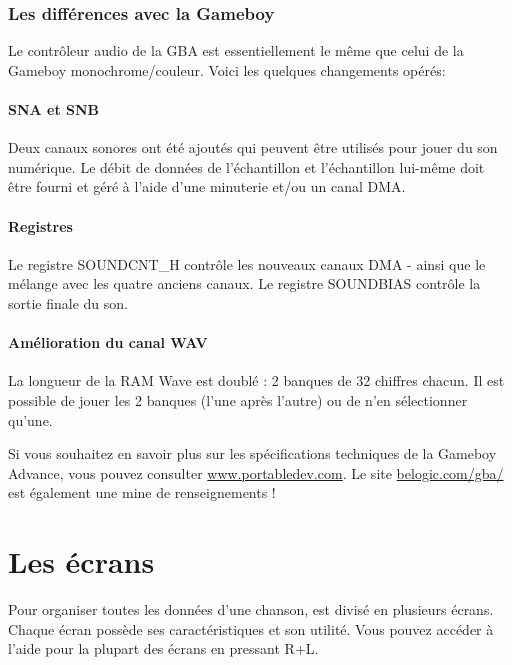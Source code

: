 \documentclass[12pt,a4paper]{article}
\begin{document}
        \subsubsection{Les différences avec la Gameboy}
        
        Le contrôleur audio de la GBA est essentiellement le même que celui de la Gameboy monochrome/couleur. Voici les quelques changements opérés:
        
            \paragraph{SNA et SNB} Deux canaux sonores ont été ajoutés qui peuvent être utilisés pour jouer du son numérique. Le débit de données de l'échantillon et l'échantillon lui-même doit être fourni et géré à l'aide d'une minuterie et/ou un canal DMA.
            
            \paragraph{Registres} Le registre SOUNDCNT\_H contrôle les nouveaux canaux DMA - ainsi que le mélange avec les quatre anciens canaux. Le registre SOUNDBIAS contrôle la sortie finale du son.
            
            \paragraph{Amélioration du canal WAV} La longueur de la RAM Wave est doublé : 2 banques de 32 chiffres chacun. Il est possible de jouer les 2 banques (l'une après l'autre) ou de n'en sélectionner qu'une.
            
            \medskip
  Si vous souhaitez en savoir plus sur les spécifications techniques de la Gameboy Advance, vous pouvez consulter \href{http://www.portabledev.com/media/GBA/tutoriels/gbatek.htm}{www.portabledev.com}. Le site \href{http://belogic.com/gba/}{belogic.com/gba/} est également une mine de renseignements !
        
  \section{Les écrans}
  
    Pour organiser toutes les données d'une chanson, \FAT est divisé en plusieurs écrans. Chaque écran possède ses caractéristiques et son utilité. Vous pouvez accéder à l'aide pour la plupart des écrans en pressant R+L.
  
\end{document}
